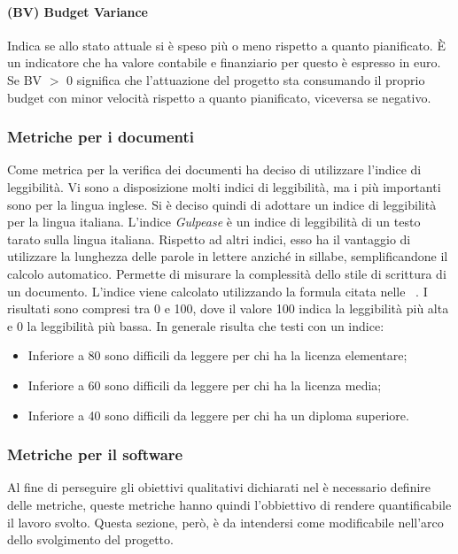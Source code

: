 \paragraph{(BV) Budget Variance}
Indica se allo stato attuale si è speso più o meno rispetto a quanto pianificato.
È un indicatore che ha valore contabile e finanziario per questo è espresso in euro.
Se BV $>$ 0 significa che l’attuazione del progetto sta consumando il proprio budget con minor velocità rispetto a quanto pianificato, viceversa se negativo.

\subsubsection{Metriche per i documenti}
Come metrica per la verifica dei documenti \gruppo ha deciso di utilizzare l’indice di leggibilità.
Vi sono a disposizione molti indici di leggibilità, ma i più importanti sono per la lingua inglese. Si è deciso quindi di adottare un indice di leggibilità per la lingua italiana.
L’indice \textit{Gulpease} è un indice di leggibilità di un testo tarato sulla lingua italiana. Rispetto ad altri indici, esso ha il vantaggio di utilizzare la lunghezza delle parole in lettere anziché in sillabe, semplificandone il calcolo automatico. Permette di misurare la complessità dello stile di scrittura di un documento.
L’indice viene calcolato utilizzando la formula citata nelle \infoNDP~.
I risultati sono compresi tra 0 e 100, dove il valore 100 indica la leggibilità più alta e 0 la leggibilità più bassa. In generale risulta che testi con un indice:
\begin{itemize}
\item Inferiore a 80 sono difficili da leggere per chi ha la licenza elementare;
\item Inferiore a 60 sono difficili da leggere per chi ha la licenza media;
\item Inferiore a 40 sono difficili da leggere per chi ha un diploma superiore.
\end{itemize}

\subsubsection{Metriche per il software}
Al fine di perseguire gli obiettivi qualitativi dichiarati nel \PianoDiQualifica{} è necessario definire delle metriche, queste metriche hanno quindi l'obbiettivo di rendere quantificabile il lavoro svolto. Questa sezione, però, è da intendersi come modificabile nell'arco dello svolgimento del progetto.


